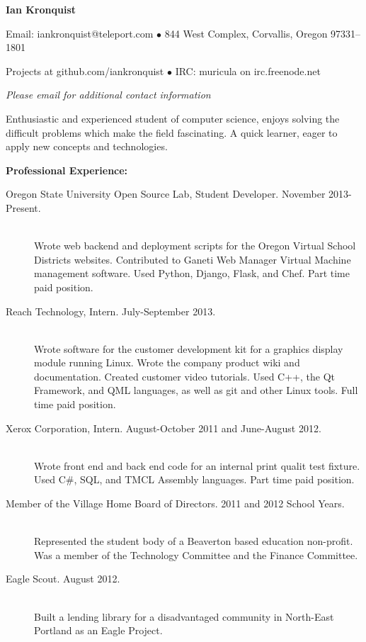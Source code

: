 \documentclass[11pt]{article}
\begin{document}
\centerline{{\LARGE \bf Ian Kronquist}}

\bigskip

\centerline{
	Email: iankronquist@teleport.com
	$\bullet$
	844 West Complex, Corvallis, Oregon 97331–1801
}
\centerline{
	Projects at github.com/iankronquist
	$\bullet$
        IRC: muricula on irc.freenode.net
}
\centerline{
        \emph{
		Please email for additional contact information
	}
}


\bigskip
\hrulefill
\bigskip

Enthusiastic and experienced student of computer science, enjoys solving the 
difficult problems which make the field fascinating. A quick learner, eager 
to apply new concepts and technologies.

\bigskip


{\Large \bf Professional Experience:}
\begin{description}
	\item[Oregon State University Open Source Lab, Student Developer.
		\hfill November 2013-Present.]
		\hfill \\
		Wrote web backend and deployment scripts for the 
		Oregon Virtual School Districts websites. 
		Contributed to Ganeti Web Manager Virtual Machine 
		management software. Used Python, Django, Flask, and Chef. 
		Part time paid position. 
	\item[Reach Technology, Intern.
		\hfill July-September 2013.]
		\hfill \\
		Wrote software for the customer development kit for a graphics
		display module running Linux. Wrote the company product wiki 
		and documentation. Created customer video tutorials. Used C++,
		the Qt Framework, and QML languages, as well as git and other 
		Linux tools. Full time paid position. 
	\item[Xerox Corporation, Intern.
		\hfill  August-October 2011 and June-August 2012.]
		\hfill \\
		Wrote front end and back end code for an internal print qualit
	 	test fixture.
		Used C\#, SQL, and TMCL Assembly languages.
		Part time paid position.  
	\item[Member of the Village Home Board of Directors.
		\hfill 2011 and 2012 School Years.]
		\hfill \\
		Represented the student body of a Beaverton based education 
		non-profit.
		Was a member of the Technology Committee and the Finance 
		Committee.
	\item[Eagle Scout.
		\hfill August 2012.]
		\hfill \\
		Built a lending library for a disadvantaged community in 
		North-East Portland as an Eagle Project.
\end{description}
\end{document}
